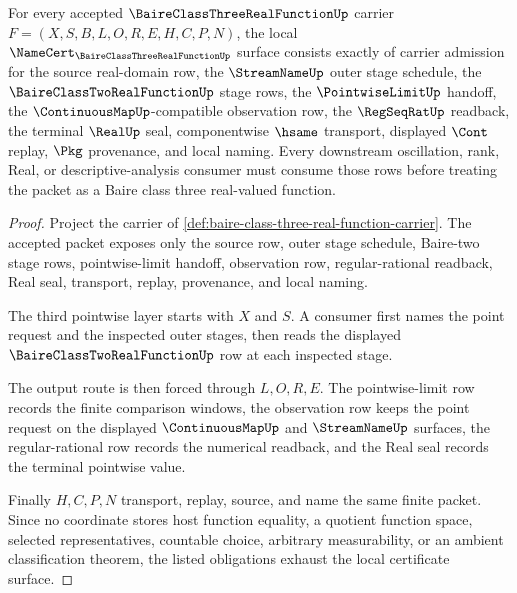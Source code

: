 \begin{theorem}
\label{thm:baire-class-three-real-function-namecert-obligations}
For every accepted $\BaireClassThreeRealFunctionUp$ carrier $F=(X,S,B,L,O,R,E,H,C,P,N)$, the local $\NameCert_{\BaireClassThreeRealFunctionUp}$ surface consists exactly of carrier admission for the source real-domain row, the $\StreamNameUp$ outer stage schedule, the $\BaireClassTwoRealFunctionUp$ stage rows, the $\PointwiseLimitUp$ handoff, the $\ContinuousMapUp$-compatible observation row, the $\RegSeqRatUp$ readback, the terminal $\RealUp$ seal, componentwise $\hsame$ transport, displayed $\Cont$ replay, $\Pkg$ provenance, and local naming. Every downstream oscillation, rank, Real, or descriptive-analysis consumer must consume those rows before treating the packet as a Baire class three real-valued function.
\end{theorem}
\begin{proof}
Project the carrier of \autoref{def:baire-class-three-real-function-carrier}. The accepted packet exposes only the source row, outer stage schedule, Baire-two stage rows, pointwise-limit handoff, observation row, regular-rational readback, Real seal, transport, replay, provenance, and local naming.

The third pointwise layer starts with $X$ and $S$. A consumer first names the point request and the inspected outer stages, then reads the displayed $\BaireClassTwoRealFunctionUp$ row at each inspected stage.

The output route is then forced through $L,O,R,E$. The pointwise-limit row records the finite comparison windows, the observation row keeps the point request on the displayed $\ContinuousMapUp$ and $\StreamNameUp$ surfaces, the regular-rational row records the numerical readback, and the Real seal records the terminal pointwise value.

Finally $H,C,P,N$ transport, replay, source, and name the same finite packet. Since no coordinate stores host function equality, a quotient function space, selected representatives, countable choice, arbitrary measurability, or an ambient classification theorem, the listed obligations exhaust the local certificate surface.
\end{proof}

